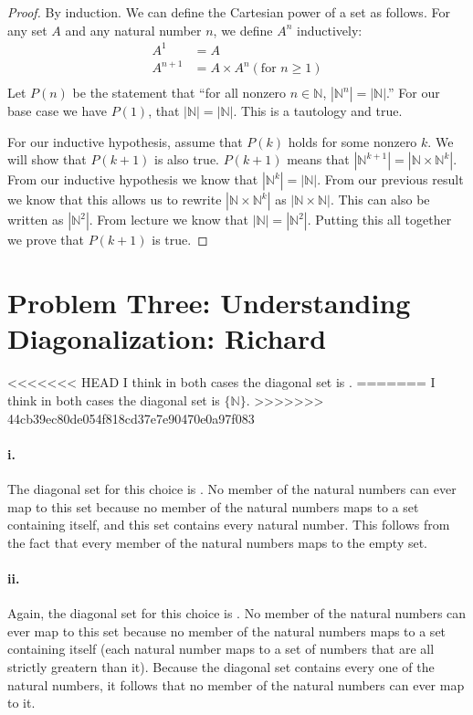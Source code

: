 \documentclass[10pt,letter]{article}
\begin{document}
\begin{proof} By induction. We can define the Cartesian power of a set as follows. For any set $A$ and any natural number $n$, we define $A^n$ inductively:
\begin{align*}
A^1 &= A \\
A^{n+1} &= A \times A^n (\text{for } n \ge 1)\\
\end{align*}
Let $P(n)$ be the statement that ``for all nonzero $n \in \mathbb{N}$, $|\mathbb{N}^n| = |\mathbb{N}|$.'' For our base case we have $P(1)$, that $|\mathbb{N}| = |\mathbb{N}|$. This is a tautology and true.

For our inductive hypothesis, assume that $P(k)$ holds for some nonzero $k$. We will show that $P(k+1)$ is also true. $P(k+1)$ means that $|\mathbb{N}^{k+1}| = |\mathbb{N} \times \mathbb{N}^k|$. From our inductive hypothesis we know that $|\mathbb{N}^k| = |\mathbb{N}|$. From our previous result we know that this allows us to rewrite $|\mathbb{N} \times \mathbb{N}^k|$ as $|\mathbb{N} \times \mathbb{N}|$. This can also be written as $|\mathbb{N}^2|$. From lecture we know that $|\mathbb{N}| = |\mathbb{N}^2|$. Putting this all together we prove that $P(k+1)$ is true.
\end{proof}


\section*{Problem Three: Understanding Diagonalization: Richard}
<<<<<<< HEAD
I think in both cases the diagonal set is .
=======
I think in both cases the diagonal set is $\{\mathbb{N}\}$.
>>>>>>> 44cb39ec80de054f818cd37e7e90470e0a97f083

\paragraph{i.} The diagonal set for this choice is . No member of the natural numbers can ever map to this set because no member of the natural numbers maps to a set containing itself, and this set contains every natural number. This follows from the fact that every member of the natural numbers maps to the empty set.

\paragraph{ii.} Again, the diagonal set for this choice is . No member of the natural numbers can ever map to this set because no member of the natural numbers maps to a set containing itself (each natural number maps to a set of numbers that are all strictly greatern than it). Because the diagonal set contains every one of the natural numbers, it follows that no member of the natural numbers can ever map to it.
\end{document}
